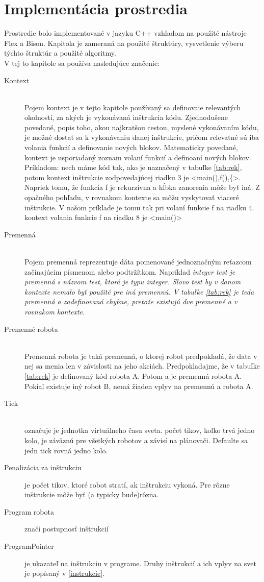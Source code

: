 \chapter{Implementácia prostredia}
Prostredie bolo implementované v jazyku C++ vzhľadom na použité nástroje Flex a Bison. Kapitola je zameraná na použité štruktúry, vysvetlenie výberu týchto štruktúr a použité algoritmy.\\
V tej to kapitole sa používa nasledujúce značenie:
\begin{description}
\item[Kontext]\hfill \\
	Pojem kontext je v tejto kapitole používaný sa definovaie relevantých okolností, za akých je vykonávaná inštrukcia kódu. Zjednodušene povedané, popis toho, akou najkratšou cestou, myslené vykonávaním kódu, je možné dostať sa k vykonávaniu danej inštrukcie, pričom relevatné sú iba volania funkcií a definovanie nových blokov. Matematicky povedané, kontext je usporiadaný zoznam volaní funkcií a definoaní nových blokov. Príkladom: nech máme kód tak, ako je naznačený v tabuľke \ref{tab:rek}, potom kontext inštrukcie zodpovedajúcej riadku 3 je <main(),f(),\{>. Napriek tomu, že funkcia f je rekurzívna a hĺbka zanorenia môže byť iná. Z opačného pohľadu, v rovnakom kontexte sa môžu vyskytovať viaceré inštrukcie. V našom príklade je tomu tak pri volaní funkcie f na riadku 4. kontext volania  funkcie f na riadku 8 je <main()>
\item[Premenná] \hfill \\
	Pojem premenná reprezentuje dáta pomenované jednoznačným reťazcom začínajúcim písmenom alebo podtržítkom. Napríklad \it{integer test} je premenná s názvom test, ktorá je typu integer. Slovo test by v danom kontexte nemalo byť použité pre inú premennú. V tabuľke \ref{tab:rek} je teda premenná a zadefinovaná chybne, pretože existujú dve premenné a v rovnakom kontexte.
\item[Premenné robota]\hfill \\
Premenná robota je taká premenná, o ktorej robot predpokladá, že data v nej sa menia len v závislosti na jeho akciách. Predpokladajme, že v tabuľke \ref{tab:rek} je definovaný kód robota A. Potom a je premenná robota A. Pokiaľ existuje iný robot B, nemá žiaden vplyv na premennú a robota A.
\item [Tick] \hfill \\
	označuje je jednotka virtuálneho času sveta. počet tikov, koľko trvá jedno kolo, je záväznú pre všetkých robotov a závisí na plánovači. Defaulte sa jedn tick rovná jedno kolo.
\item[Penalizácia za inštrukciu]
	je počet tikov, ktoré robot stratí, ak inštrukciu vykoná. Pre rôzne inštrukcie môže byť (a typicky bude)rôzna.
\item [Program robota] 
	značí postupnosť inštrukcií
\item [ProgramPointer]
 	je ukazateľ na inštrukciu v programe. Druhy inštrukcií a ich vplyv na svet je popísaný v \ref{instrukcie}.
\end{description}

